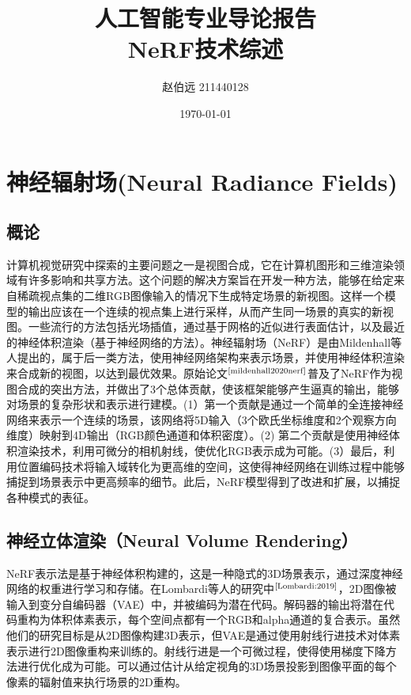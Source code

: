 \documentclass[UTF8,titlepage]{article}
\newcommand{\upcite}[1]{$^{\mbox{\scriptsize \cite{#1}}}$}
\numberwithin{figure}{section}
\begin{document}
\title{人工智能专业导论报告\\{\Large NeRF技术综述}}
\author{赵伯远 211440128}
\date{\today}
\maketitle
\tableofcontents
\clearpage
\section{神经辐射场(Neural Radiance Fields) }
\subsection{概论}

计算机视觉研究中探索的主要问题之一是视图合成，它在计算机图形和三维渲染领域有许多影响和共享方法。这个问题的解决方案旨在开发一种方法，能够在给定来自稀疏视点集的二维RGB图像输入的情况下生成特定场景的新视图。这样一个模型的输出应该在一个连续的视点集上进行采样，从而产生同一场景的真实的新视图。一些流行的方法包括光场插值，通过基于网格的近似进行表面估计，以及最近的神经体积渲染（基于神经网络的方法）。神经辐射场（NeRF）是由Mildenhall等人提出的，属于后一类方法，使用神经网络架构来表示场景，并使用神经体积渲染来合成新的视图，以达到最优效果。原始论文\upcite{mildenhall2020nerf}普及了NeRF作为视图合成的突出方法，并做出了3个总体贡献，使该框架能够产生逼真的输出，能够对场景的复杂形状和表示进行建模。(1）第一个贡献是通过一个简单的全连接神经网络来表示一个连续的场景，该网络将5D输入（3个欧氏坐标维度和2个观察方向维度）映射到4D输出（RGB颜色通道和体积密度）。(2) 第二个贡献是使用神经体积渲染技术，利用可微分的相机射线，使优化RGB表示成为可能。(3）最后，利用位置编码技术将输入域转化为更高维的空间，这使得神经网络在训练过程中能够捕捉到场景表示中更高频率的细节。此后，NeRF模型得到了改进和扩展，以捕捉各种模式的表征。

\subsection{神经立体渲染（Neural Volume Rendering）}

NeRF表示法是基于神经体积构建的，这是一种隐式的3D场景表示，通过深度神经网络的权重进行学习和存储。在Lombardi等人的研究中\upcite{Lombardi:2019}，2D图像被输入到变分自编码器（VAE）中，并被编码为潜在代码。解码器的输出将潜在代码重构为体积体素表示，每个空间点都有一个RGB和alpha通道的复合表示。虽然他们的研究目标是从2D图像构建3D表示，但VAE是通过使用射线行进技术对体素表示进行2D图像重构来训练的。射线行进是一个可微过程，使得使用梯度下降方法进行优化成为可能。可以通过估计从给定视角的3D场景投影到图像平面的每个像素的辐射值来执行场景的2D重构。
\end{document}

